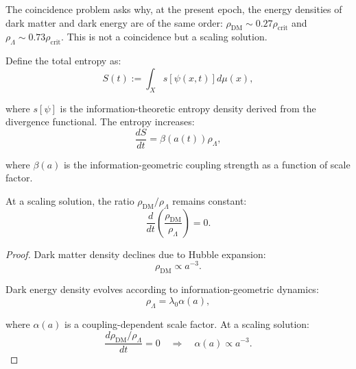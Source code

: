 \begin{theorem}
\label{thm:coincidenceProblemResolution}

The coincidence problem asks why, at the present epoch, the energy densities of dark matter and dark energy are of the same order: $\rho_{\text{DM}} \sim 0.27 \rho_{\text{crit}}$ and $\rho_\Lambda \sim 0.73 \rho_{\text{crit}}$. This is not a coincidence but a scaling solution.

\begin{definition}

Define the total entropy as:
\begin{equation}
S(t) := \int_X s[\psi(x, t)] d\mu(x),
\end{equation}

where $s[\psi]$ is the information-theoretic entropy density derived from the divergence functional. The entropy increases:
\begin{equation}
\frac{dS}{dt} = \beta(a(t)) \rho_\Lambda,
\end{equation}

where $\beta(a)$ is the information-geometric coupling strength as a function of scale factor.

At a scaling solution, the ratio $\rho_{\text{DM}} / \rho_\Lambda$ remains constant:
\begin{equation}
\frac{d}{dt}\left(\frac{\rho_{\text{DM}}}{\rho_\Lambda}\right) = 0.
\end{equation}

\end{definition}

\begin{proof}

Dark matter density declines due to Hubble expansion:
\begin{equation}
\rho_{\text{DM}} \propto a^{-3}.
\end{equation}

Dark energy density evolves according to information-geometric dynamics:
\begin{equation}
\rho_\Lambda = \lambda_0 \alpha(a),
\end{equation}

where $\alpha(a)$ is a coupling-dependent scale factor. At a scaling solution:
\begin{equation}
\frac{d\rho_{\text{DM}} / \rho_\Lambda}{dt} = 0 \quad \Rightarrow \quad \alpha(a) \propto a^{-3}.
\end{equation}


\end{proof}
\end{theorem}
